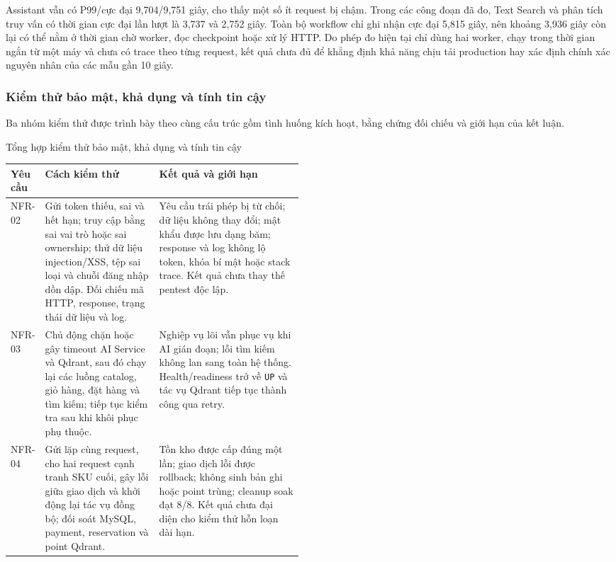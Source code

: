 Assistant vẫn có P99/cực đại 9,704/9,751 giây, cho thấy một số ít request bị chậm.
Trong các công đoạn đã đo, Text Search và phân tích truy vấn có thời gian cực đại lần
lượt là 3,737 và 2,752 giây. Toàn bộ workflow chỉ ghi nhận cực đại 5,815 giây, nên
khoảng 3,936 giây còn lại có thể nằm ở thời gian chờ worker, đọc checkpoint hoặc xử
lý HTTP. Do phép đo hiện tại chỉ dùng hai worker, chạy trong thời gian ngắn từ một
máy và chưa có trace theo từng request, kết quả chưa đủ để khẳng định khả năng chịu
tải production hay xác định chính xác nguyên nhân của các mẫu gần 10 giây.

\subsubsection{Kiểm thử bảo mật, khả dụng và tính tin cậy}

Ba nhóm kiểm thử được trình bày theo cùng cấu trúc gồm tình huống kích hoạt,
bằng chứng đối chiếu và giới hạn của kết luận.

\begin{breakabletable}
\centering
\caption{Tổng hợp kiểm thử bảo mật, khả dụng và tính tin cậy}
\label{tab:nfr-security-reliability}
\footnotesize
\setlength{\tabcolsep}{3pt}
\renewcommand{\arraystretch}{0.95}
\begin{tabularx}{\linewidth}{|>{\centering\arraybackslash}p{0.09\linewidth}|>{\RaggedRight\arraybackslash}p{0.39\linewidth}|>{\RaggedRight\arraybackslash}X|}
\hline
\textbf{Yêu cầu} & \textbf{Cách kiểm thử} & \textbf{Kết quả và giới hạn} \\ \hline
NFR-02 & Gửi token thiếu, sai và hết hạn; truy cập bằng sai vai trò hoặc sai ownership; thử dữ liệu injection/XSS, tệp sai loại và chuỗi đăng nhập dồn dập. Đối chiếu mã HTTP, response, trạng thái dữ liệu và log. & Yêu cầu trái phép bị từ chối; dữ liệu không thay đổi; mật khẩu được lưu dạng băm; response và log không lộ token, khóa bí mật hoặc stack trace. Kết quả chưa thay thế pentest độc lập. \\ \hline
NFR-03 & Chủ động chặn hoặc gây timeout AI Service và Qdrant, sau đó chạy lại các luồng catalog, giỏ hàng, đặt hàng và tìm kiếm; tiếp tục kiểm tra sau khi khôi phục phụ thuộc. & Nghiệp vụ lõi vẫn phục vụ khi AI gián đoạn; lỗi tìm kiếm không lan sang toàn hệ thống. Health/readiness trở về \texttt{UP} và tác vụ Qdrant tiếp tục thành công qua retry. \\ \hline
NFR-04 & Gửi lặp cùng request, cho hai request cạnh tranh SKU cuối, gây lỗi giữa giao dịch và khởi động lại tác vụ đồng bộ; đối soát MySQL, payment, reservation và point Qdrant. & Tồn kho được cấp đúng một lần; giao dịch lỗi được rollback; không sinh bản ghi hoặc point trùng; cleanup soak đạt 8/8. Kết quả chưa đại diện cho kiểm thử hỗn loạn dài hạn. \\ \hline
\end{tabularx}
\end{breakabletable}

